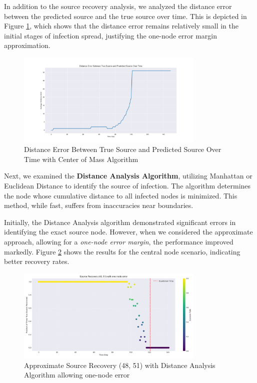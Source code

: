 In addition to the source recovery analysis, we analyzed the distance error between the predicted source and the true source over time. This is depicted in Figure \ref{fig:distance_error_true_predicted_source_center_mass}, which shows that the distance error remains relatively small in the initial stages of infection spread, justifying the one-node error margin approximation.

\begin{figure}[H]
    \centering
    \includegraphics[width=0.8\textwidth]{Distance_Error_True_Predicted_Source_Center_Mass.png}
    \caption{Distance Error Between True Source and Predicted Source Over Time with Center of Mass Algorithm}
    \label{fig:distance_error_true_predicted_source_center_mass}
\end{figure}

Next, we examined the \textbf{Distance Analysis Algorithm}, utilizing Manhattan or Euclidean Distance to identify the source of infection. The algorithm determines the node whose cumulative distance to all infected nodes is minimized. This method, while fast, suffers from inaccuracies near boundaries.

Initially, the Distance Analysis algorithm demonstrated significant errors in identifying the exact source node. However, when we considered the approximate approach, allowing for a \textit{one-node error margin}, the performance improved markedly. Figure \ref{fig:Approx_Source_Recovery_48_51_Distance_Analysis} shows the results for the central node scenario, indicating better recovery rates.

\begin{figure}[H]
    \centering
    \includegraphics[width=0.8\textwidth]{Approx_Source_Recovery_48_51_Distance_Analysis.png}
    \caption{Approximate Source Recovery (48, 51) with Distance Analysis Algorithm allowing one-node error}
    \label{fig:Approx_Source_Recovery_48_51_Distance_Analysis}
\end{figure}

